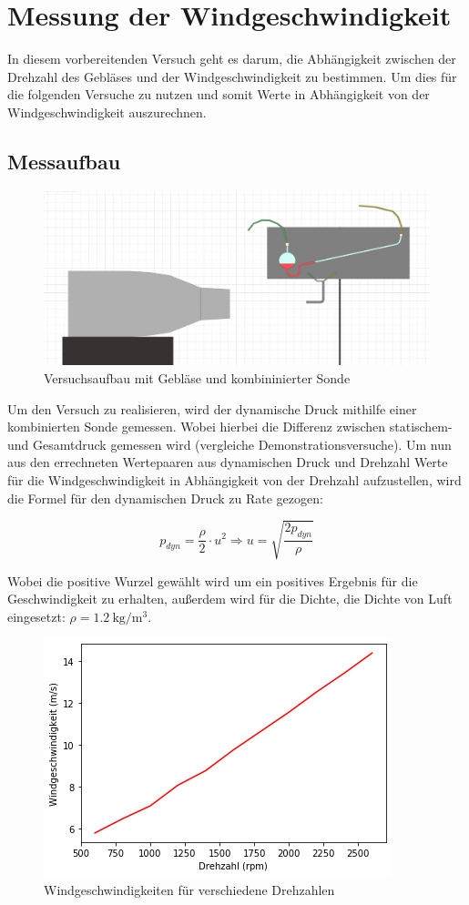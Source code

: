 \section{Messung der Windgeschwindigkeit}

In diesem vorbereitenden Versuch geht es darum, die Abhängigkeit zwischen der Drehzahl des Gebläses und der Windgeschwindigkeit zu bestimmen. Um dies für die folgenden Versuche zu nutzen und somit Werte in Abhängigkeit von der Windgeschwindigkeit auszurechnen.

\subsection{Messaufbau}

\begin{figure}[h!]
    \centering
    \includegraphics[scale=0.3]{Aeromechanik/Protokoll/fig/Kombi_Sonde.png}
    \caption{Versuchsaufbau mit Gebläse und kombininierter Sonde}
    \label{fig:Aeromechanik Versuch 1.2}
\end{figure}


Um den Versuch zu realisieren, wird der dynamische Druck mithilfe einer kombinierten Sonde gemessen. Wobei hierbei die Differenz zwischen statischem- und Gesamtdruck gemessen wird (vergleiche Demonstrationsversuche). Um nun aus den errechneten Wertepaaren aus dynamischen Druck und Drehzahl Werte für die Windgeschwindigkeit in Abhängigkeit von der Drehzahl aufzustellen, wird die Formel für den dynamischen Druck zu Rate gezogen: 

\begin{equation}
    p_{dyn} = \frac{\rho}{2} \cdot u^2
    \Rightarrow u = \sqrt{\frac{2p_{dyn}}{\rho}}
\end{equation}

Wobei die positive Wurzel gewählt wird um ein positives Ergebnis für die Geschwindigkeit zu erhalten, außerdem wird für die Dichte, die Dichte von Luft eingesetzt: $\rho = \SI{1.2}{\kg\per\cubic\m}$.

\begin{figure}[h!]
    \centering
    \includegraphics[scale=0.8]{Aeromechanik/Protokoll/fig/Aeromechanik Versuch 1.2.png}
    \caption{Windgeschwindigkeiten für verschiedene Drehzahlen}
    \label{fig:Aeromechanik Versuch 1.2}
\end{figure}